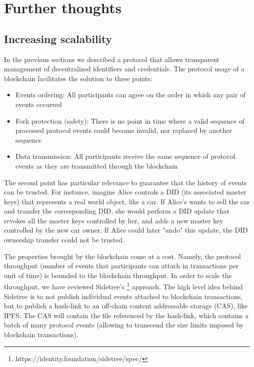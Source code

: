 \documentclass[10pt,a4paper]{article}
\begin{document}
\section{Further thoughts}

\subsection{Increasing scalability} 

In the previous sections we described a protocol that allows transparent management of decentralized identifiers and credentials.
The protocol usage of a blockchain facilitates the solution to three points:
\begin{itemize}
\item Events ordering: All participants can agree on the order in which any pair of events occurred 
\item Fork protection (safety): There is no point in time where a valid sequence of processed protocol events could become invalid, nor replaced by 
      another sequence
\item Data transmission: All participants receive the same sequence of protocol events as they are transmitted through the blockchain
\end{itemize}

The second point has particular relevance to guarantee that the history of events can be trusted. For instance, imagine Alice controls a DID (its 
associated master keys) that represents a real world object, like a car. If Alice's wants to sell the car and transfer the corresponding DID, she 
would perform a DID update that revokes all the master keys controlled by her, and adds a new master key controlled by the new car owner. If Alice 
could later "undo" this update, the DID ownership transfer could not be trusted.

The properties brought by the blockchain come at a cost. Namely, the protocol throughput (number of events that participants can attach in 
transactions per unit of time) is bounded to the blockchain throughput. In order to scale the throughput, we have reviewed Sidetree's  \footnote{https://identity.foundation/sidetree/spec/} approach. The high level idea behind Sidetree is to not publish individual events attached to blockchain 
transactions, but to publish a hash-link to an off-chain content addressable storage (CAS), like IPFS. The CAS will contain the file referenced by 
the hash-link, which contains a batch of many protocol events (allowing to transcend the size limits imposed by blockchain transactions).
\end{document}
